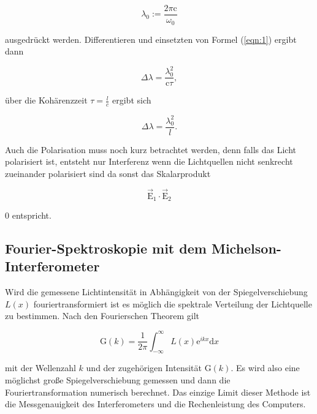         \begin{equation}
            \lambda_0 := \frac{2 \pi \text{c}}{\omega_0}    \nonumber 
        \end{equation}

        \noindent ausgedrückt werden. Differentieren und einsetzten von Formel (\ref{eqn:1}) ergibt dann 

        \begin{equation}
            \Delta \lambda = \frac{\lambda_0^2}{\text{c}\tau},     \nonumber 
        \end{equation}

        \noindent über die Kohärenzzeit $\tau = \frac{l}{c}$ ergibt sich 

        \begin{equation}
            \Delta \lambda = \frac{\lambda_0^2}{l}.    \nonumber 
        \end{equation}

        \noindent Auch die Polarisation muss noch kurz betrachtet werden, denn falls das Licht polarisiert ist, entsteht nur Interferenz 
        wenn die Lichtquellen nicht senkrecht zueinander polarisiert sind da sonst das Skalarprodukt 
     
        \begin{equation}
            \vec{\text{E}}_1 \cdot \vec{\text{E}}_2     \nonumber 
        \end{equation}

        \noindent $0$ entspricht.

    \subsection{Fourier-Spektroskopie mit dem Michelson-Interferometer}

            \noindent Wird die gemessene Lichtintensität in Abhängigkeit von der Spiegelverschiebung $L(x)$ fouriertransformiert ist es möglich 
            die spektrale Verteilung der Lichtquelle zu bestimmen. Nach den Fourierschen Theorem gilt 

            \begin{equation*}
                 \text{G}(k) = \frac{1}{2\pi} \int_{- \infty}^{\infty} L(x) \text{e}^{ikx} \text{d}x    \nonumber 
            \end{equation*}

            \noindent mit der Wellenzahl $k$ und der zugehörigen Intensität G$(k)$. Es wird also eine möglichst große Spiegelverschiebung gemessen 
            und dann die Fouriertransformation numerisch berechnet. Das einzige Limit dieser Methode ist die Messgenauigkeit des Interferometers und 
            die Rechenleistung des Computers.

